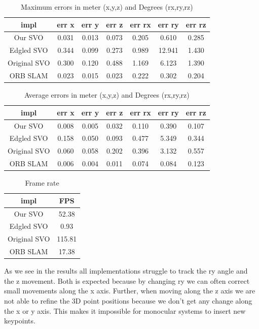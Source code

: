\documentclass[11pt,a4paper,titlepage,oneside]{report}
\begin{document}
\begin{table}[H]
  \centering
  \begin{tabular}{|c|c|c|c|c|c|c|}
    impl & err x & err y & err z & err rx & err ry & err rz\\
    \hline
    Our SVO & 0.031 & 0.013 & 0.073 & 0.205 & 0.610 & 0.285\\
    Edgled SVO & 0.344 & 0.099 & 0.273 & 0.989 & 12.941 & 1.430\\
    Original SVO & 0.300 & 0.120 & 0.488 & 1.169 & 6.123 & 1.390\\
    ORB SLAM& 0.023 & 0.015 & 0.023 & 0.222 & 0.302 & 0.204
  \end{tabular}
  \caption{Maximum errors in meter (x,y,z) and Degrees (rx,ry,rz)}
  \label{tab:maximas}
\end{table}

\begin{table}[H]
  \centering
  \begin{tabular}{|c|c|c|c|c|c|c|}
  impl & err x & err y & err z & err rx & err ry & err rz\\
  \hline
  Our SVO & 0.008 & 0.005 & 0.032 & 0.110 & 0.390 & 0.107\\
  Edgled SVO & 0.158 & 0.050 & 0.093 & 0.477 & 5.349 & 0.344\\
  Original SVO & 0.060 & 0.058 & 0.202 & 0.396 & 3.132 & 0.557\\
  ORB SLAM & 0.006 & 0.004 & 0.011 & 0.074 & 0.084 & 0.123
\end{tabular}

\caption{Average errors in meter (x,y,z) and Degrees (rx,ry,rz)}
\label{tab:average}
\end{table}

\begin{table}[H]
  \centering
  \begin{tabular}{|c|c|}
  impl & FPS\\
  \hline
  Our SVO & 52.38\\
  Edgled SVO & 0.93\\
  Original SVO & 115.81\\
  ORB SLAM & 17.38
\end{tabular}
\caption{Frame rate}
\label{tab:fps}
\end{table}

As we see in the results all implementations struggle to track the ry angle and the z movement. Both is expected because by changing ry we can often correct small movements along the x axis. Further, when moving along the z axis we are not able to refine the 3D point positions because we don't get any change along the x or y axis. This makes it impossible for monocular systems to insert new keypoints.
\end{document}

